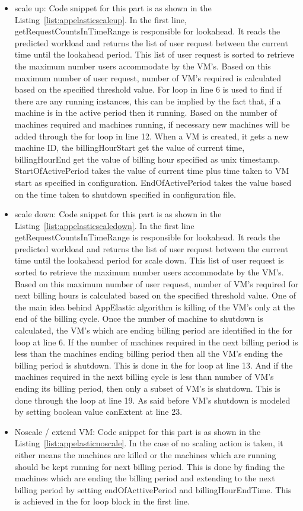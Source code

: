 \begin{itemize}
  \item scale up: Code snippet for this part is as shown in the Listing~\ref{list:appelasticscaleup}. In the first line, getRequestCountsInTimeRange is responsible for lookahead. It reads the predicted workload and returns the list of user request between the current time until the lookahead period. This list of user request is sorted to retrieve the maximum number users accommodate by the VM's. Based on this maximum number of user request, number of VM's required is calculated based on the specified threshold value.  For loop in line 6 is used to find if there are any running instances, this can be implied by the fact that, if a machine is in the active period then it running.
  Based on the number of machines required and machines running, if necessary new machines will be added through the for loop in line 12.  When a VM is created, it gets a new machine ID, the  billingHourStart get the value of current time,  billingHourEnd get the value of billing hour specified as unix timestamp.  StartOfActivePeriod takes the value of current time plus time taken to VM start as specified in configuration. EndOfActivePeriod takes the value based on the time taken to shutdown specified in configuration file.
  \item scale down:  Code snippet for this part is as shown in the Listing~\ref{list:appelasticscaledown}.  In the first line getRequestCountsInTimeRange is responsible for lookahead. It reads the predicted workload and returns the list of user request between the current time until the lookahead period for scale down. This list of user request is sorted to retrieve the maximum number users accommodate by the VM's. Based on this maximum number of user request, number of VM's required for next billing hours is calculated based on the specified threshold value. One of the main idea behind AppElastic algorithm is killing of the VM's only at the end of the billing cycle. Once the number of machine to shutdown is calculated, the VM's which are ending billing period are identified in the for loop at line 6. If the number of machines required in the next billing period is less than the machines ending billing period then all the VM's ending the billing period is shutdown. This is done in the for loop at line 13. And if the machines required in the next billing cycle is less than number of VM's ending its billing period, then only  a subset of VM's is shutdown. This is done through the loop at line 19.  As said before VM's shutdown is modeled by setting boolean value canExtent at line 23.
  \item Noscale / extend VM:  Code snippet for this part is as shown in the Listing~\ref{list:appelasticnoscale}.  In the case of no scaling action is taken, it either means the machines are killed or the machines which are running should be kept running for next billing period. This is done by finding the machines which are ending the billing period and extending to the next billing period by setting endOfActtivePeriod and billingHourEndTime. This is achieved in the for loop block in the first line.
\end{itemize}
